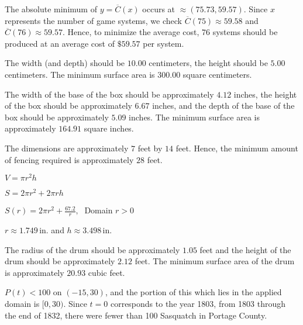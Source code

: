 \begin{exenum}

\item  The absolute minimum of $y=\overline{C}(x)$ occurs at $\approx (75.73, 59.57)$.  Since $x$ represents the number of game systems, we check $\overline{C}(75) \approx 59.58$ and $\overline{C}(76) \approx 59.57$.  Hence, to minimize the average cost, $76$ systems should be produced at an average cost of $\$59.57$ per system.

\item The width (and depth) should be $10.00$ centimeters, the height should be $5.00$ centimeters.  The minimum surface area is $300.00$ square centimeters.

\item The width of the base of the box should be approximately $4.12$ inches, the height of the box should be approximately $ 6.67$ inches, and the depth of the base of the box should be approximately $5.09$ inches. The minimum surface area is approximately $164.91$ square inches.

\item The dimensions are  approximately  $7$ feet by $14$ feet.  Hence, the minimum amount of fencing required is approximately  $28$ feet.

\item 

\begin{shortenumerate}
\item $V = \pi r^{2}h$
\item $S = 2 \pi r^{2} + 2\pi r h$
\item $S(r) = 2\pi r^{2} + \frac{67.2}{r}, \;$  Domain $r > 0$
\item $r \approx 1.749\,$in. and $h \approx 3.498\,$in. 
\end{shortenumerate}

\item  The radius of the drum should be approximately $1.05$ feet and the height of the drum should be approximately  $2.12$ feet.  The minimum surface area of the drum is approximately $20.93$ cubic feet.

\item $P(t) < 100$ on $(-15, 30)$, and the portion of this which lies in the applied domain is $[0,30)$.  Since $t=0$ corresponds to the year 1803, from 1803 through the end of 1832, there were fewer than 100 Sasquatch in Portage County.

\end{exenum}